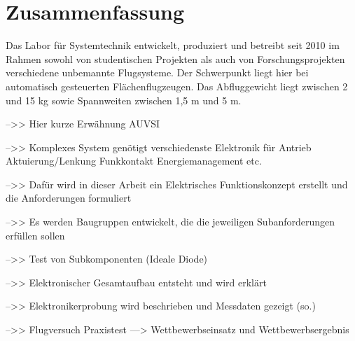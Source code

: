\chapter*{Zusammenfassung}

Das Labor für Systemtechnik entwickelt, produziert und betreibt seit 2010 im Rahmen sowohl von studentischen Projekten als auch von Forschungsprojekten verschiedene unbemannte Flugsysteme.
Der Schwerpunkt liegt hier bei automatisch gesteuerten Flächenflugzeugen.
Das Abfluggewicht liegt zwischen 2 und 15 kg sowie Spannweiten zwischen 1,5 m und 5 m.

-->> Hier kurze Erwähnung AUVSI 

-->> Komplexes System genötigt verschiedenste Elektronik für Antrieb Aktuierung/Lenkung Funkkontakt Energiemanagement etc.

-->> Dafür wird in dieser Arbeit ein Elektrisches Funktionskonzept erstellt und die Anforderungen formuliert

-->> Es werden Baugruppen entwickelt, die die jeweiligen Subanforderungen erfüllen sollen

-->> Test von Subkomponenten (Ideale Diode)

-->> Elektronischer Gesamtaufbau entsteht und wird erklärt

-->> Elektronikerprobung wird beschrieben und Messdaten gezeigt (so.)

-->> Flugversuch Praxistest ---> Wettbewerbseinsatz und Wettbewerbsergebnis


